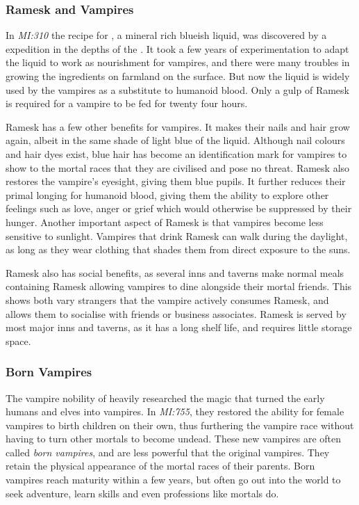 \subsubsection{Ramesk and Vampires}

In \emph{MI:310} the recipe for , a mineral rich blueish
liquid, was discovered by a  expedition in the depths of
the . It took a few years of experimentation to
adapt the liquid to work as nourishment for vampires, and there were many
troubles in growing the ingredients on farmland on the surface. But now the
liquid is widely used by the vampires as a substitute to humanoid blood. Only
a gulp of Ramesk is required for a vampire to be fed for twenty four hours.

Ramesk has a few other benefits for vampires. It makes their nails and hair
grow again, albeit in the same shade of light blue of the liquid. Although
nail colours and hair dyes exist, blue hair has become an identification mark
for vampires to show to the mortal races that they are civilised and pose no
threat. Ramesk also restores the vampire's eyesight, giving them blue
pupils. It further reduces their primal longing for humanoid blood, giving
them the ability to explore other feelings such as love, anger or grief which
would otherwise be suppressed by their hunger. Another important aspect of
Ramesk is that vampires become less sensitive to sunlight. Vampires that drink
Ramesk can walk during the daylight, as long as they wear clothing that shades
them from direct exposure to the suns.

Ramesk also has social benefits, as several inns and taverns make normal meals
containing Ramesk allowing vampires to dine alongside their mortal friends.
This shows both vary strangers that the vampire actively consumes Ramesk, and
allows them to socialise with friends or business associates. Ramesk is served
by most major inns and taverns, as it has a long shelf life, and requires
little storage space.

\subsubsection{Born Vampires}
\label{sec:Born Vampires}

The vampire nobility of  heavily researched the magic
that turned the early humans and elves into vampires. In \emph{MI:755}, they
restored the ability for female vampires to birth children on their own, thus
furthering the vampire race without having to turn other mortals to become
undead. These new vampires are often called \emph{born vampires}, and are less
powerful that the original vampires. They retain the physical appearance of
the mortal races of their parents. Born vampires reach maturity within a few
years, but often go out into the world to seek adventure, learn skills and
even professions like mortals do.

